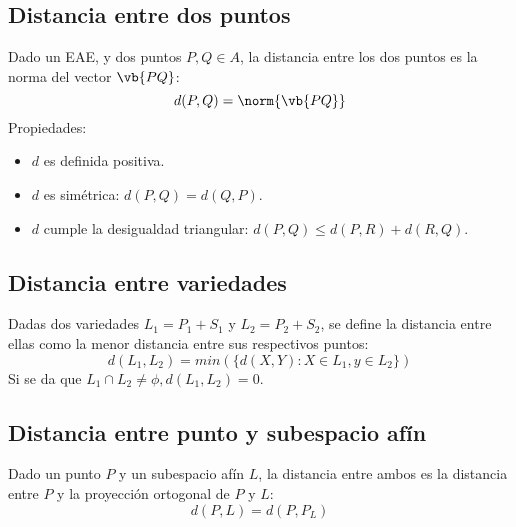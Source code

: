 \documentclass{./Geometria.tex}
\begin{document}
\subsection{Distancia entre dos puntos}
\begin{defin}
Dado un EAE, y dos puntos $P,Q \in A$, la distancia entre los dos puntos es la norma del vector $\vb{PQ}$:
\[
	d(P,Q) = \norm{\vb{PQ}}
\]
Propiedades:
\begin{itemize}
	\item $d$ es definida positiva.
	\item $d$ es simétrica: $d(P,Q) = d(Q,P)$.
	\item $d$ cumple la desigualdad triangular: $d(P,Q) \leq d(P,R) + d(R,Q)$. 
\end{itemize}
\end{defin}
\subsection{Distancia entre variedades}
\begin{defin}
Dadas dos variedades $L_1=P_1+S_1$ y $L_2=P_2+S_2$, se define la distancia entre ellas como la menor distancia entre sus respectivos puntos:
\[
	d(L_1,L_2) = min(\{ d(X,Y) : X \in L_1, y \in L_2 \})
\]
Si se da que $L_1 \cap L_2 \neq \phi, d(L_1,L_2) = 0$.
\end{defin}
\subsection{Distancia entre punto y subespacio afín}
\begin{defin}
Dado un punto $P$ y un subespacio afín $L$, la distancia entre ambos es la distancia entre $P$ y la proyección ortogonal de $P$ y $L$:
\[
	d(P,L)= d(P,P_{L})
\]
\end{defin}
\end{document}
